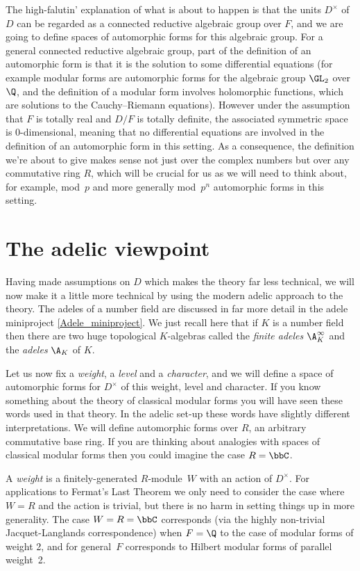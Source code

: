 The high-falutin' explanation of what is about to happen is that the units $D^\times$ of $D$
can be regarded as a connected reductive algebraic group over $F$, and we are going to define spaces
of automorphic forms for this algebraic group. For a general connected reductive algebraic group,
part of the definition of an automorphic form is that it is the solution to some differential
equations (for example modular forms are automorphic forms for the algebraic group $\GL_2$ over
$\Q$, and the definition of a modular form involves holomorphic functions, which are solutions to
the Cauchy--Riemann equations). However under the assumption that $F$ is totally real and $D/F$ is
totally definite, the associated symmetric space is 0-dimensional, meaning that no differential
equations are involved in the definition
of an automorphic form in this setting. As a consequence, the definition we're about to give
makes sense not just over the complex numbers but over any commutative ring $R$, which will
be crucial for us as we will need to think about, for example, mod~$p$ and more generally
mod~$p^n$ automorphic forms in this setting.

\section{The adelic viewpoint}

Having made assumptions on $D$ which makes the theory far less technical, we will now
make it a little more technical by using the modern adelic approach to the theory.
The adeles of a number field are discussed in far more detail
in the adele miniproject \ref{Adele_miniproject}. We just recall here that if $K$ is a number field
then there are two huge topological $K$-algebras called the \emph{finite adeles}
$\A_K^\infty$ and the \emph{adeles} $\A_K$ of $K$.

Let us now fix a \emph{weight}, a \emph{level} and a \emph{character}, and we will define
a space of automorphic forms for $D^\times$ of this weight, level and character. If you know
something about the theory of classical modular forms you will have seen these words used in that
theory. In the adelic set-up these words have slightly different interpretations. We will define
automorphic forms over $R$, an arbitrary commutative base ring. If you are thinking about analogies
with spaces of classical modular forms then you could imagine the case $R=\bbC$.

A \emph{weight} is a finitely-generated $R$-module~$W$ with an action of $D^\times$. For applications
to Fermat's Last Theorem we only need to consider the case where $W=R$ and the action is trivial,
but there is no harm in setting things up in more generality. The case $W=R=\bbC$ corresponds (via
the highly non-trivial Jacquet-Langlands correspondence) when $F=\Q$ to the case of modular forms
of weight 2, and for general~$F$ corresponds to Hilbert modular forms of parallel weight~2.

